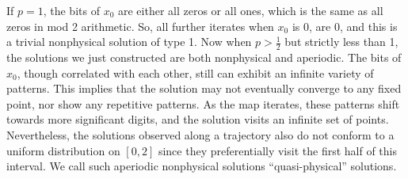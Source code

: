 If $p = 1$, the bits of $x_0$ are either all zeros or all ones, which is the same as all zeros in mod 2 arithmetic. So, all further iterates when $x_0$ is 0, are 0, and this is a trivial nonphysical solution of type 1.  Now when $p > \frac12$ but strictly less than 1, 
the solutions we just constructed are both nonphysical and aperiodic.
The bits of $x_0$, though correlated with each other,
still can exhibit an infinite variety of patterns. 
This implies that the solution may not eventually converge to 
any fixed point, nor show any repetitive patterns.  
 As the map iterates, these patterns
shift towards more significant digits, and the solution visits an infinite set of
points. 
 Nevertheless, the solutions observed along a trajectory also 
 do not conform to a uniform distribution on $[0,2]$ since they 
 preferentially visit the first half of this interval.
We call such aperiodic nonphysical solutions ``quasi-physical'' solutions.

